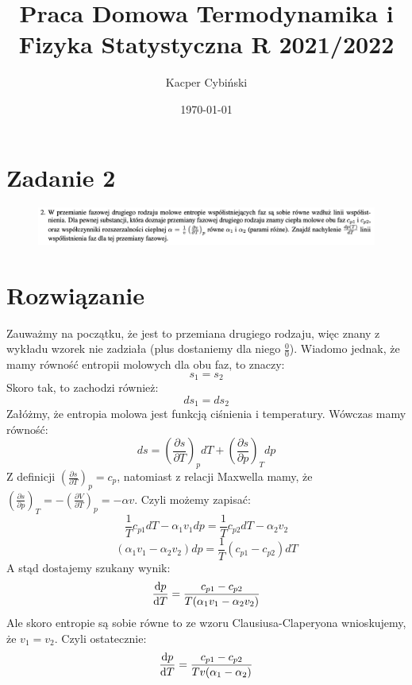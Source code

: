 \documentclass[12pt,a4paper]{article}
\title{Praca Domowa Termodynamika i Fizyka Statystyczna R 2021/2022}
\author{Kacper Cybiński}
\date{\today}
\begin{document}
\maketitle

\section{Zadanie 2}

\begin{figure}[h!]
    \includegraphics[width=\linewidth]{z2.png}
\end{figure}

\section{Rozwiązanie}

Zauważmy na początku, że jest to przemiana drugiego rodzaju, więc znany z wykładu wzorek nie zadziała (plus dostaniemy dla niego $\frac{0}{0}$).
    Wiadomo jednak, że mamy równość entropii molowych dla obu faz, to znaczy:
    \[s_1=s_2\]
    Skoro tak, to zachodzi również:
    \[ds_1=ds_2\]
    Załóżmy, że entropia molowa jest funkcją ciśnienia i temperatury.
    Wówczas mamy równość:
    \[ds=\left(\frac{\partial s}{\partial T}\right)_pdT+\left(\frac{\partial s}{\partial p}\right)_T dp\]
    Z definicji $\left(\frac{\partial s}{\partial T}\right)_p=c_p$, natomiast z relacji Maxwella mamy, że
    $\left(\frac{\partial s}{\partial p}\right)_T=-\left(\frac{\partial V}{\partial T}\right)_p=-\alpha v$.
    Czyli możemy zapisać:
    \[\frac{1}{T}c_{p1}dT-\alpha_1v_1dp=\frac{1}{T}c_{p2}dT-\alpha_2v_2\]
    \[(\alpha_1v_1-\alpha_2v_2)dp=\frac{1}{T}(c_{p1}-c_{p2})dT\]
    A stąd dostajemy szukany wynik:
    \[\dv{p}{T}=\frac{c_{p1}-c_{p2}}{T(\alpha_1v_1-\alpha_2v_2)}\]
    Ale skoro entropie są sobie równe to ze wzoru Clausiusa-Claperyona wnioskujemy, że $v_1=v_2$.
    Czyli ostatecznie:
    \[\dv{p}{T}=\frac{c_{p1}-c_{p2}}{Tv(\alpha_1-\alpha_2)}\]
\end{document}
